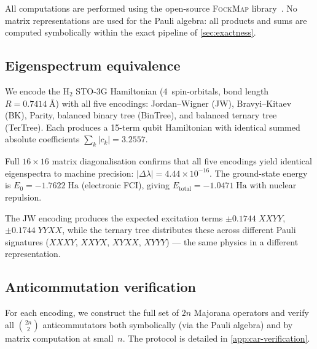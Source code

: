%

All computations are performed using the open-source \textsc{FockMap}
library~\cite{fockmap2026}.  No matrix representations are used for the
Pauli algebra: all products and sums are computed symbolically within
the exact pipeline of \cref{sec:exactness}.

\subsection{Eigenspectrum equivalence}
\label{sec:val-eigen}

We encode the H$_2$ STO-3G Hamiltonian (4~spin-orbitals, bond
length $R = 0.7414\;\text{\AA}$) with all five encodings:
Jordan--Wigner (JW), Bravyi--Kitaev (BK), Parity, balanced binary
tree (BinTree), and balanced ternary tree (TerTree).  Each produces a
15-term qubit Hamiltonian with identical summed absolute coefficients
$\sum_k |c_k| = 3.2557$.

Full $16 \times 16$ matrix diagonalisation confirms that all five
encodings yield identical eigenspectra to machine precision:
$|\Delta\lambda| = 4.44 \times 10^{-16}$.  The ground-state energy is
$E_0 = -1.7622\;\text{Ha}$ (electronic FCI), giving
$E_\text{total} = -1.0471\;\text{Ha}$ with nuclear repulsion.

The JW encoding produces the expected excitation terms
$\pm 0.1744\; XXYY$, $\pm 0.1744\; YYXX$, while the ternary tree
distributes these across different Pauli signatures ($XXXY$, $XXYX$,
$XYXX$, $XYYY$) — the same physics in a different representation.

\subsection{Anticommutation verification}
\label{sec:val-car}

For each encoding, we construct the full set of $2n$ Majorana
operators and verify all $\binom{2n}{2}$ anticommutators both
symbolically (via the Pauli algebra) and by matrix computation
at small~$n$.  The protocol is detailed in \cref{app:car-verification}.

